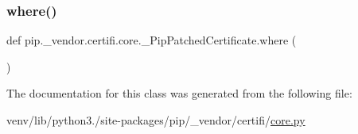 \subsubsection{\texorpdfstring{where()}{where()}\hspace{0.1cm}{\footnotesize\ttfamily [2/2]}}
{\footnotesize\ttfamily def pip.\+\_\+vendor.\+certifi.\+core.\+\_\+\+Pip\+Patched\+Certificate.\+where (\begin{DoxyParamCaption}{ }\end{DoxyParamCaption})}



The documentation for this class was generated from the following file\+:\begin{DoxyCompactItemize}
\item 
venv/lib/python3./site-\/packages/pip/\+\_\+vendor/certifi/\hyperlink{pip_2__vendor_2certifi_2core_8py}{core.\+py}\end{DoxyCompactItemize}
